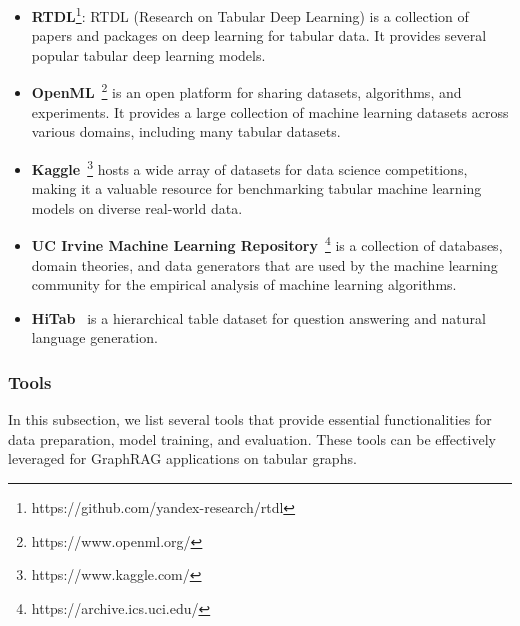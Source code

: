 \begin{itemize}[leftmargin=*]
    \item \textbf{RTDL}\footnote{https://github.com/yandex-research/rtdl}: RTDL (Research on Tabular Deep Learning) is a collection of papers and packages on deep learning for tabular data. It provides several popular tabular deep learning models.
    \item \textbf{OpenML}~\footnote{https://www.openml.org/} is an open platform for sharing datasets, algorithms, and experiments. It provides a large collection of machine learning datasets across various domains, including many tabular datasets.
    \item \textbf{Kaggle}~\footnote{https://www.kaggle.com/} hosts a wide array of datasets for data science competitions, making it a valuable resource for benchmarking tabular machine learning models on diverse real-world data.
    \item \textbf{UC Irvine Machine Learning Repository}~\citep{dua2017uci}\footnote{https://archive.ics.uci.edu/} is a collection of databases, domain theories, and data generators that are used by the machine learning community for the empirical analysis of machine learning algorithms.
    \item \textbf{HiTab}~\citep{cheng2021hitab} is a hierarchical table dataset for question answering and natural language generation.
\end{itemize}


\subsubsection{Tools}
In this subsection, we list several tools that provide essential functionalities for data preparation, model training, and evaluation.  These tools can be effectively leveraged for GraphRAG applications on tabular graphs.


